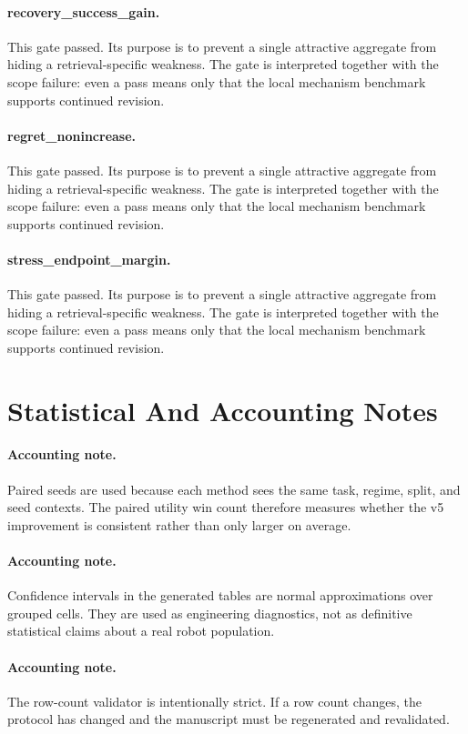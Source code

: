 \documentclass{article}
\begin{document}
\paragraph{recovery\_success\_gain.} This gate passed. Its purpose is to prevent a single attractive aggregate from hiding a retrieval-specific weakness. The gate is interpreted together with the scope failure: even a pass means only that the local mechanism benchmark supports continued revision.
\paragraph{regret\_nonincrease.} This gate passed. Its purpose is to prevent a single attractive aggregate from hiding a retrieval-specific weakness. The gate is interpreted together with the scope failure: even a pass means only that the local mechanism benchmark supports continued revision.
\paragraph{stress\_endpoint\_margin.} This gate passed. Its purpose is to prevent a single attractive aggregate from hiding a retrieval-specific weakness. The gate is interpreted together with the scope failure: even a pass means only that the local mechanism benchmark supports continued revision.
\section{Statistical And Accounting Notes}
\paragraph{Accounting note.} Paired seeds are used because each method sees the same task, regime, split, and seed contexts. The paired utility win count therefore measures whether the v5 improvement is consistent rather than only larger on average.
\paragraph{Accounting note.} Confidence intervals in the generated tables are normal approximations over grouped cells. They are used as engineering diagnostics, not as definitive statistical claims about a real robot population.
\paragraph{Accounting note.} The row-count validator is intentionally strict. If a row count changes, the protocol has changed and the manuscript must be regenerated and revalidated.
\end{document}
